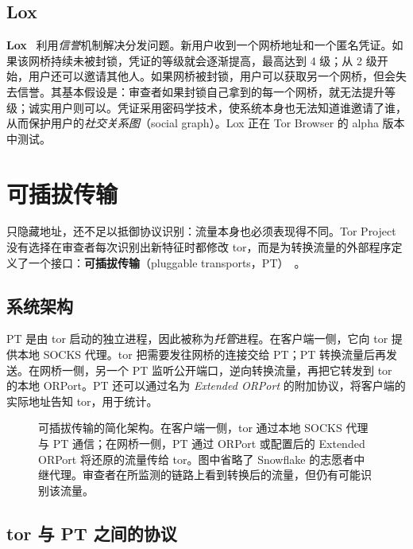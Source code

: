 \subsection{Lox}

\textbf{Lox}~\cite{tulloch2023lox} 利用\emph{信誉}机制解决分发问题。新用户收到一个网桥地址和一个匿名凭证。如果该网桥持续未被封锁，凭证的等级就会逐渐提高，最高达到 4 级；从 2 级开始，用户还可以邀请其他人。如果网桥被封锁，用户可以获取另一个网桥，但会失去信誉。其基本假设是：审查者如果封锁自己拿到的每一个网桥，就无法提升等级；诚实用户则可以。凭证采用密码学技术，使系统本身也无法知道谁邀请了谁，从而保护用户的\emph{社交关系图}（social graph）。Lox 正在 Tor Browser 的 alpha 版本中测试。

\section{可插拔传输}\label{sec:cens-pt}

只隐藏地址，还不足以抵御协议识别：流量本身也必须表现得不同。Tor Project 没有选择在审查者每次识别出新特征时都修改 tor，而是为转换流量的外部程序定义了一个接口：\textbf{可插拔传输}（pluggable transports，PT）~。

\subsection{系统架构}

PT 是由 tor 启动的独立进程，因此被称为\emph{托管}进程。在客户端一侧，它向 tor 提供本地 SOCKS 代理。tor 把需要发往网桥的连接交给 PT；PT 转换流量后再发送。在网桥一侧，另一个 PT 监听公开端口，逆向转换流量，再把它转发到 tor 的本地 ORPort。PT 还可以通过名为 \emph{Extended ORPort} 的附加协议，将客户端的实际地址告知 tor，用于统计。

\begin{figure}[htbp]
\centering

\caption{可插拔传输的简化架构。在客户端一侧，tor 通过本地 SOCKS 代理与 PT 通信；在网桥一侧，PT 通过 ORPort 或配置后的 Extended ORPort 将还原的流量传给 tor。图中省略了 Snowflake 的志愿者中继代理。审查者在所监测的链路上看到转换后的流量，但仍有可能识别该流量。}
\label{fig:pt}
\end{figure}

\subsection{tor 与 PT 之间的协议}

